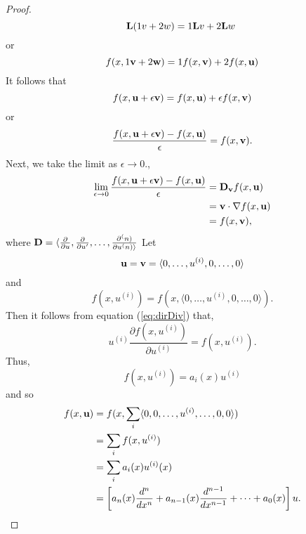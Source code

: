 \begin{proof}
\begin{equation*}
			\mathrm{\bf{L}}(1 v + 2 w) = 1 \mathrm{\bf{L}} v + 2 \mathrm{\bf{L}} w\
	\end{equation*}
	or
	\begin{equation*}
		f(x,1 \textbf{v} + 2 \textbf{w})= 1 f(x, \textbf{v}) + 2 f(x, \textbf{u})
	\end{equation*}
	It follows that 
	\begin{equation*}
		f(x, \textbf{u} + \epsilon \textbf{v}) = f(x, \textbf{u}) + \epsilon f(x, \textbf{v})
	\end{equation*}
	or
	\begin{equation*}
		\frac{f(x, \textbf{u} + \epsilon \textbf{v})-f(x,\textbf{u})}{\epsilon} = f(x,\textbf{v}).
	\end{equation*}
	Next, we take the limit as \(\epsilon \to 0\).,
	\begin{equation}\label{eq:dirDiv}
		\begin{split}
			\lim_{\epsilon \to 0}\frac{f(x, \textbf{u} + \epsilon \textbf{v} )-f(x,\textbf{u} )}{\epsilon} &= \mathrm{\bf{D}}_{\textbf{v}} f(x,\textbf{u})\\
			&= \textbf{v} \cdot \nabla f(x,\textbf{u})\\
			&= f(x,\textbf{v}),
		\end{split}
	\end{equation}
	where \(\mathrm{\bf{D}}=\langle \frac{\partial}{\partial u}, \frac{\partial}{\partial u'}, \dots, \frac{\partial^(n)}{\partial u^(n)\rangle} \)
	Let 
	\begin{equation*}
		\textbf{u} = \textbf{v} = \langle 0, \dots, u^{(i)}, 0, \dots, 0 \rangle
	\end{equation*}
	and
	\begin{equation*}
		f(x,u^{(i)}) = f(x, \langle 0, \dots, u^{(i)}, 0, \dots, 0 \rangle ).
	\end{equation*}
	Then it follows from equation (\ref{eq:dirDiv}) that,
	\begin{equation*}
		u^{(i)}\frac{\partial f(x, u^{(i)})}{\partial u^{(i)}} = f(x,u^{(i)}).
	\end{equation*}
	Thus, 
	\begin{equation*}
		f(x,u^{(i)}) = a_i(x)u^{(i)}
	\end{equation*} 
	and so 
	\begin{equation*}
		\begin{split}
			f(x,\textbf{u}) &= f(x, \sum_i \langle 0, 0, \dots, u^{(i)}, \dots, 0, 0 \rangle)\\
			&=\sum_i f(x,u^{(i)}) \\
			&= \sum_i a_i(x)u^{(i)}(x)\\
			&= \left[a_n(x) \frac{d^n}{dx^n} + a_{n-1}(x) \frac{d^{n-1}}{dx^{n-1}} + \cdots + a_0(x)\right]u.
		\end{split}
	\end{equation*}
\end{proof}

